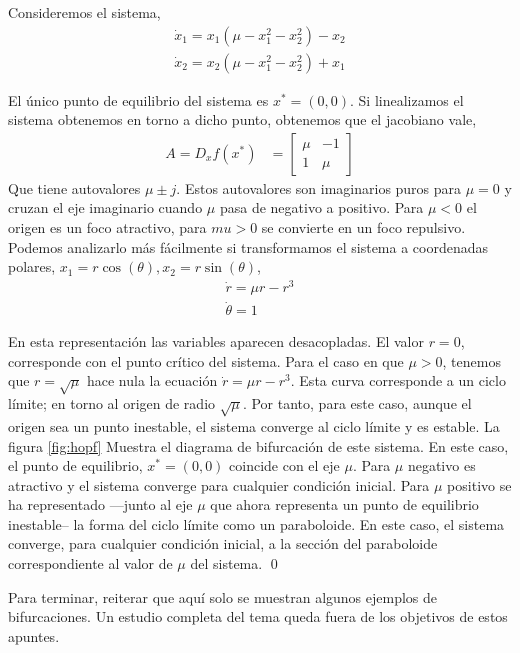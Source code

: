 \begin{example}\label{ex:hopf}
Consideremos el sistema,
\begin{align*}
\dot x_1 = x_1(\mu-x_1^2-x_2^2)-x_2\\
\dot x_2 = x_2(\mu-x_1^2-x_2^2) +x_1
\end{align*}

El único punto de equilibrio del sistema es $x^*= (0,0)$. Si linealizamos el sistema obtenemos en torno a dicho punto, obtenemos que el jacobiano vale,
\begin{align*}
	A = D_xf(x^*) &=  \begin{bmatrix}
		\mu &  -1 \\
		1 & \mu
	\end{bmatrix}
\end{align*}
Que tiene autovalores $\mu\pm j$. Estos autovalores son imaginarios puros para $\mu=0$ y cruzan el eje imaginario cuando $\mu$ pasa de negativo a positivo. Para $\mu<0$ el origen es un foco atractivo, para $mu>0$ se convierte en un foco repulsivo.
Podemos analizarlo más fácilmente si transformamos el sistema a coordenadas polares, $x_1= r\cos(\theta), x_2 = r\sin(\theta)$,
\begin{align*}
\dot r = \mu r - r^3\\
\dot \theta = 1
\end{align*}

En esta representación las variables aparecen desacopladas. El valor $r=0$, corresponde con el punto crítico del sistema. Para el caso en que $\mu>0$, tenemos que $r=\sqrt{\mu}$ hace nula la ecuación  $\dot r = \mu r - r^3$. Esta curva corresponde a un ciclo límite; en torno al origen de radio $\sqrt{\mu}$. Por tanto, para este caso, aunque el origen sea un punto inestable, el sistema converge al ciclo límite y es estable. La figura \ref{fig:hopf} Muestra el diagrama de bifurcación de este sistema.  En este caso, el punto de equilibrio, $x^*=(0,0)$ coincide con el eje $\mu$. Para $\mu$ negativo es atractivo y el sistema converge para cualquier condición inicial. Para $\mu$ positivo se ha representado ---junto al eje $\mu$ que ahora representa un punto de equilibrio inestable--   la forma del ciclo límite como un paraboloide. En este caso, el sistema converge, para cualquier condición inicial,  a la sección del paraboloide correspondiente al valor de $\mu$ del sistema.
\qed
\end{example}

Para terminar, reiterar que aquí solo se muestran algunos ejemplos de bifurcaciones. Un estudio completa del tema queda fuera de los objetivos de estos apuntes.
\newpage
